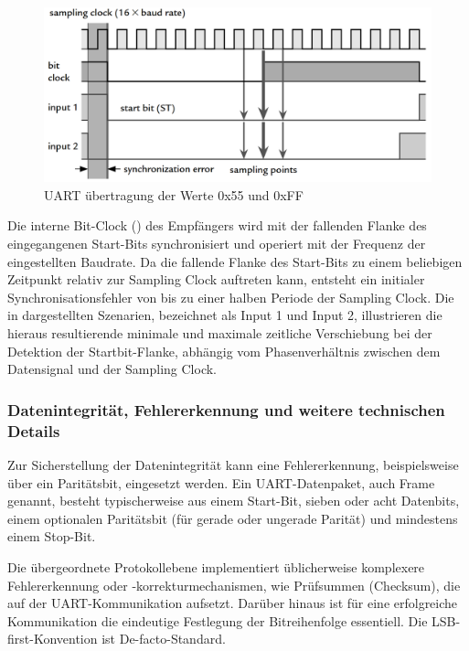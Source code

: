 \newpage
\begin{figure}[h!]
	\centering
	\includegraphics[width=1.0\textwidth]{../Bilder/uart_protocoll.png}
	\caption{UART \"ubertragung der Werte 0x55 und 0xFF\\}
	\label{fig:uart_uebertragung}
\end{figure}

Die interne Bit-Clock () des Empf\"angers wird mit der fallenden Flanke des eingegangenen Start-Bits synchronisiert und operiert mit der Frequenz der eingestellten Baudrate. Da die fallende Flanke des Start-Bits zu einem beliebigen Zeitpunkt relativ zur Sampling Clock auftreten kann, entsteht ein initialer Synchronisationsfehler von bis zu einer halben Periode der Sampling Clock. Die in  dargestellten Szenarien, bezeichnet als \glqq Input 1\grqq{} und \glqq Input 2\grqq{}, illustrieren die hieraus resultierende minimale und maximale zeitliche Verschiebung bei der Detektion der Startbit-Flanke, abh\"angig vom Phasenverh\"altnis zwischen dem Datensignal und der Sampling Clock. 

\subsubsection{Datenintegrit\"at, Fehlererkennung und weitere technischen Details}
\label{sec:datenintegritaet}

Zur Sicherstellung der Datenintegrit\"at kann eine Fehlererkennung, beispielsweise \"uber ein Parit\"atsbit, eingesetzt werden. Ein UART-Datenpaket, auch Frame genannt, besteht typischerweise aus einem Start-Bit, sieben oder acht Datenbits, einem optionalen Parit\"atsbit (f\"ur gerade oder ungerade Parit\"at) und mindestens einem Stop-Bit.

\newpage
Die \"ubergeordnete Protokollebene implementiert \"ublicherweise komplexere Fehlererkennung oder -korrekturmechanismen, wie \zB Pr\"ufsummen (Checksum), die auf der UART-Kommunikation aufsetzt. Dar\"uber hinaus ist f\"ur eine erfolgreiche Kommunikation die eindeutige Festlegung der Bitreihenfolge essentiell. Die LSB-first-Konvention ist De-facto-Standard. 

